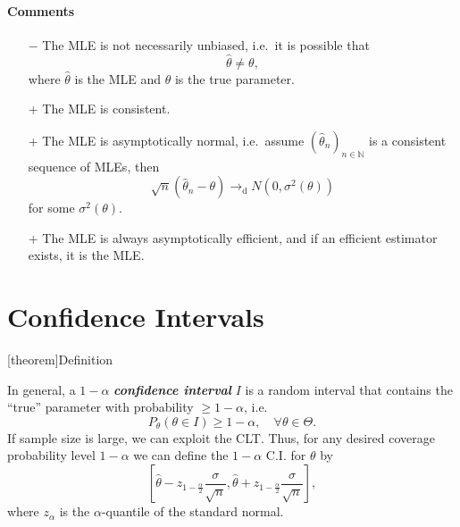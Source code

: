 \documentclass[12pt]{report}
\theoremstyle{definition}
\begin{document}
\paragraph{Comments}
\begin{itemize}
    \item [$-$] The MLE is not necessarily unbiased, i.e.\ it is possible that
        \[
            \hat{\theta} \neq \theta,
        \]
        where $\hat{\theta}$ is the MLE and $\theta$ is the true parameter.
    \item [+] The MLE is consistent.
    \item [+] The MLE is asymptotically normal, i.e.\
        assume ${(\hat{\theta}_n)}_{n\in\mathbb{N}}$ is a consistent sequence of
        MLEs, then
        \[
            \sqrt{n}(\hat{\theta}_n-\theta)\rightarrow_\text{d}N(0,\sigma^2(\theta))
        \]
        for some $\sigma^{2}(\theta)$.
    \item [+] The MLE is always asymptotically efficient, and if an efficient
        estimator exists, it is the MLE.
\end{itemize} 

\section{Confidence Intervals}

[theorem]{Definition}
\begin{confidence interval}
    In general, a $1-\alpha$ \textbf{\emph{confidence interval}} $I$
    is a random interval that contains
    the ``true'' parameter with probability $\ge 1-\alpha$, i.e.\
    \[
        P_\theta(\theta\in I)\ge 1-\alpha,\quad\forall\theta\in\Theta.
    \]
    If sample size is large, we can exploit the CLT. 
    Thus, for any desired coverage probability level $1-\alpha$ we can define the
    $1-\alpha$ C.I. for $\theta$ by
    \[
        \left[\hat{\theta}-z_{1-\frac{\alpha}{2}}\frac{\sigma}{\sqrt{n}},
        \hat{\theta}+z_{1-\frac{\alpha}{2}}\frac{\sigma}{\sqrt{n}}\right],
    \]
    where $z_\alpha$ is the $\alpha$-quantile of the standard normal.
\end{confidence interval}
\end{document}
